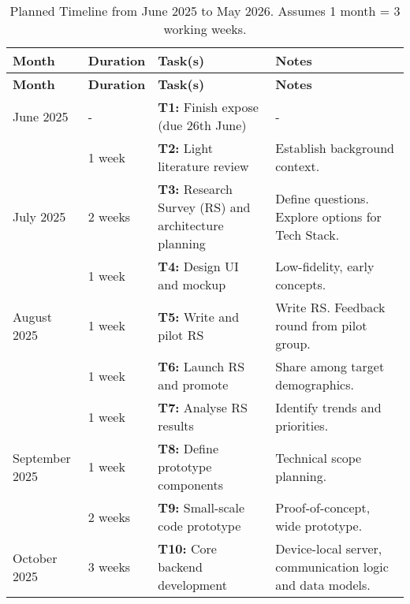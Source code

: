 \documentclass{imc-inf}
\begin{document}
\begin{longtable}{|l|l|p{7.5cm}|p{4cm}|}
\caption[]{Planned Timeline from June 2025 to May 2026. Assumes 1 month = 3 working weeks.} \\
\hline
\textbf{Month} & \textbf{Duration} & \textbf{Task(s)} & \textbf{Notes} \\
\hline
\endfirsthead

\hline
\textbf{Month} & \textbf{Duration} & \textbf{Task(s)} & \textbf{Notes} \\
\hline
\endhead

June 2025     & -        & \textbf{T1:} Finish expose (due 26th June) & - \\
              & 1 week   & \textbf{T2:} Light literature review & Establish background context. \\
\hline
July 2025     & 2 weeks  & \textbf{T3:} Research Survey (RS) and architecture
                           planning & Define questions. Explore options for Tech Stack. \\
              & 1 week   & \textbf{T4:} Design UI and mockup & Low-fidelity, early concepts. \\
\hline
August 2025   & 1 week   & \textbf{T5:} Write and pilot RS & Write RS. Feedback round from pilot group. \\
              & 1 week   & \textbf{T6:} Launch RS and promote & Share among target demographics. \\
              & 1 week   & \textbf{T7:} Analyse RS results & Identify trends and
                                                             priorities. \\
\hline
September 2025 & 1 week  & \textbf{T8:} Define prototype components & Technical scope planning. \\
               & 2 weeks & \textbf{T9:} Small-scale code prototype &
                                                                     Proof-of-concept,
                                                                     wide prototype. \\
\hline
October 2025  & 3 weeks  & \textbf{T10:} Core backend development & Device-local
                                                                    server,
                                                                    communication
                                                                    logic and
                                                                    data models. \\

\end{longtable}
\end{document}
